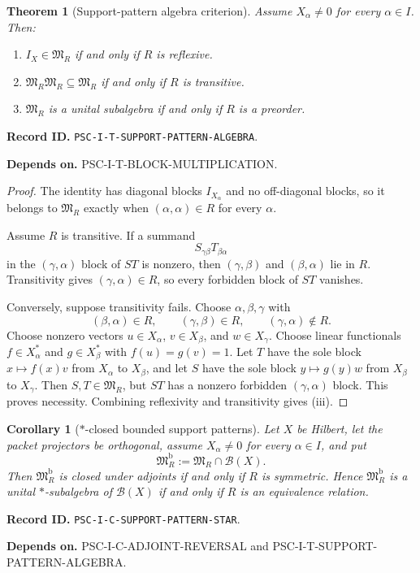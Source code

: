 \documentclass[11pt]{article}
\newtheorem{theorem}{Theorem}[section]
\newtheorem{corollary}[corollary]{Corollary}
\theoremstyle{definition}
\theoremstyle{remark}
\newcommand{\RecordID}[1]{\par\smallskip\noindent\begingroup\footnotesize\color{PSCGray}\raggedright\textbf{Record ID.} \nolinkurl{#1}.\par\endgroup}
\newcommand{\Depends}[1]{\par\noindent\begingroup\footnotesize\color{PSCGray}\raggedright\textbf{Depends on.} #1\par\endgroup}
\begin{document}
\begin{theorem}[Support-pattern algebra criterion]
\label{thm:support-pattern}
Assume $X_\alpha\neq0$ for every $\alpha\in I$.  Then:
\begin{enumerate}[label=(\roman*)]
\item $I_X\in\mathfrak M_R$ if and only if $R$ is reflexive.
\item $\mathfrak M_R\mathfrak M_R\subseteq\mathfrak M_R$ if and only if $R$ is transitive.
\item $\mathfrak M_R$ is a unital subalgebra if and only if $R$ is a preorder.
\end{enumerate}
\end{theorem}
\RecordID{PSC-I-T-SUPPORT-PATTERN-ALGEBRA}
\Depends{PSC-I-T-BLOCK-MULTIPLICATION.}

\begin{proof}
The identity has diagonal blocks $I_{X_\alpha}$ and no off-diagonal blocks, so it belongs to $\mathfrak M_R$ exactly when $(\alpha,\alpha)\in R$ for every $\alpha$.

Assume $R$ is transitive.  If a summand
\[
S_{\gamma\beta}T_{\beta\alpha}
\]
in the $(\gamma,\alpha)$ block of $ST$ is nonzero, then $(\gamma,\beta)$ and $(\beta,\alpha)$ lie in $R$.  Transitivity gives $(\gamma,\alpha)\in R$, so every forbidden block of $ST$ vanishes.

Conversely, suppose transitivity fails.  Choose $\alpha,\beta,\gamma$ with
\[
(\beta,\alpha)\in R,
\qquad
(\gamma,\beta)\in R,
\qquad
(\gamma,\alpha)\notin R.
\]
Choose nonzero vectors $u\in X_\alpha$, $v\in X_\beta$, and $w\in X_\gamma$.  Choose linear functionals $f\in X_\alpha^*$ and $g\in X_\beta^*$ with $f(u)=g(v)=1$.  Let $T$ have the sole block $x\mapsto f(x)v$ from $X_\alpha$ to $X_\beta$, and let $S$ have the sole block $y\mapsto g(y)w$ from $X_\beta$ to $X_\gamma$.  Then $S,T\in\mathfrak M_R$, but $ST$ has a nonzero forbidden $(\gamma,\alpha)$ block.  This proves necessity.  Combining reflexivity and transitivity gives (iii).
\end{proof}

\begin{corollary}[$*$-closed bounded support patterns]
\label{cor:star-support}
Let $X$ be Hilbert, let the packet projectors be orthogonal, assume $X_\alpha\neq0$ for every $\alpha\in I$, and put
\[
\mathfrak M_R^{\mathrm b}:=\mathfrak M_R\cap\mathcal B(X).
\]
Then $\mathfrak M_R^{\mathrm b}$ is closed under adjoints if and only if $R$ is symmetric.  Hence $\mathfrak M_R^{\mathrm b}$ is a unital $*$-subalgebra of $\mathcal B(X)$ if and only if $R$ is an equivalence relation.
\end{corollary}
\RecordID{PSC-I-C-SUPPORT-PATTERN-STAR}
\Depends{PSC-I-C-ADJOINT-REVERSAL and PSC-I-T-SUPPORT-PATTERN-ALGEBRA.}
\end{document}

